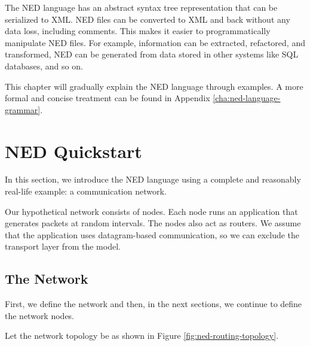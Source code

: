 
The NED language has an abstract syntax tree representation that can be serialized to
XML. NED files can be converted to XML and back without any data
loss, including comments. This makes it easier to programmatically manipulate
NED files. For example, information can be extracted, refactored, and
transformed, NED can be generated from data stored in other systems like SQL
databases, and so on.

\begin{note}
    This chapter will gradually explain the NED language through examples. A
    more formal and concise treatment can be found in Appendix
    \ref{cha:ned-language-grammar}.
\end{note}


\section{NED Quickstart}
\label{sec:ned-lang:warmup}

In this section, we introduce the NED language using a complete and reasonably
real-life example: a communication network.

Our hypothetical network consists of nodes. Each node runs an application that
generates packets at random intervals. The nodes also act as routers. We assume
that the application uses datagram-based communication, so we can exclude the
transport layer from the model.


\subsection{The Network}
\label{sec:ned-lang:warmup:network}

First, we define the network and then, in the next sections, we continue to
define the network nodes.

Let the network topology be as shown in Figure \ref{fig:ned-routing-topology}.

